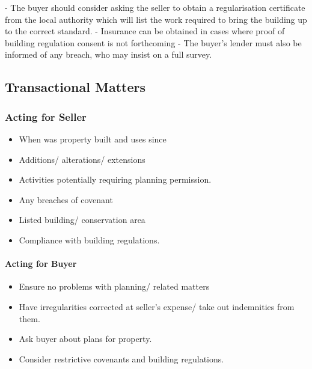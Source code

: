 \documentclass[
]{article}
\newenvironment{Shaded}{}{}
\newcommand{\NormalTok}[1]{#1}
\providecommand{\tightlist}{%
  \setlength{\itemsep}{0pt}\setlength{\parskip}{0pt}}
\begin{document}
\begin{Shaded}
\begin{Highlighting}[]
\NormalTok{{-} The buyer should consider asking the seller to obtain a regularisation certificate from the local authority which will list the work required to bring the building up to the correct standard. }
\NormalTok{{-} Insurance can be obtained in cases where proof of building regulation consent is not forthcoming}
\NormalTok{{-} The buyer’s lender must also be informed of any breach, who may insist on a full survey. }
\end{Highlighting}
\end{Shaded}

\hypertarget{transactional-matters}{%
\subsection{Transactional Matters}\label{transactional-matters}}

\hypertarget{acting-for-seller}{%
\subsubsection{Acting for Seller}\label{acting-for-seller}}

\begin{itemize}
\tightlist
\item
  When was property built and uses since
\item
  Additions/ alterations/ extensions
\item
  Activities potentially requiring planning permission.
\item
  Any breaches of covenant
\item
  Listed building/ conservation area
\item
  Compliance with building regulations.
\end{itemize}

\hypertarget{acting-for-buyer}{%
\paragraph{Acting for Buyer}\label{acting-for-buyer}}

\begin{itemize}
\tightlist
\item
  Ensure no problems with planning/ related matters
\item
  Have irregularities corrected at seller's expense/ take out
  indemnities from them.
\item
  Ask buyer about plans for property.
\item
  Consider restrictive covenants and building regulations.
\end{itemize}
\end{document}
